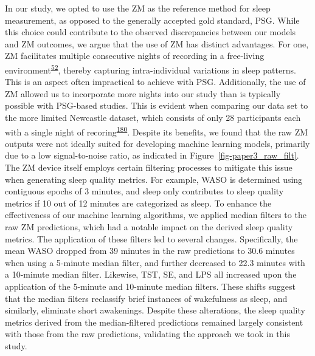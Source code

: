 \documentclass[
  10pt,
]{scrbook}
\begin{document}
In our study, we opted to use the ZM as the reference method for sleep
measurement, as opposed to the generally accepted gold standard, PSG.
While this choice could contribute to the observed discrepancies between
our models and ZM outcomes, we argue that the use of ZM has distinct
advantages. For one, ZM facilitates multiple consecutive nights of
recording in a free-living
environment\textsuperscript{\protect\hyperlink{ref-pedersen_self-administered_2021}{52}},
thereby capturing intra-individual variations in sleep patterns. This is
an aspect often impractical to achieve with PSG. Additionally, the use
of ZM allowed us to incorporate more nights into our study than is
typically possible with PSG-based studies. This is evident when
comparing our data set to the more limited Newcastle dataset, which
consists of only 28 participants each with a single night of
recoring\textsuperscript{\protect\hyperlink{ref-hees_newcastle_2018}{180}}.
Despite its benefits, we found that the raw ZM outputs were not ideally
suited for developing machine learning models, primarily due to a low
signal-to-noise ratio, as indicated in Figure~\ref{fig-paper3_raw_filt}.
The ZM device itself employs certain filtering processes to mitigate
this issue when generating sleep quality metrics. For example, WASO is
determined using contiguous epochs of 3 minutes, and sleep only
contributes to sleep quality metrics if 10 out of 12 minutes are
categorized as sleep. To enhance the effectiveness of our machine
learning algorithms, we applied median filters to the raw ZM
predictions, which had a notable impact on the derived sleep quality
metrics. The application of these filters led to several changes.
Specifically, the mean WASO dropped from 39 minutes in the raw
predictions to 30.6 minutes when using a 5-minute median filter, and
further decreased to 22.3 minutes with a 10-minute median filter.
Likewise, TST, SE, and LPS all increased upon the application of the
5-minute and 10-minute median filters. These shifts suggest that the
median filters reclassify brief instances of wakefulness as sleep, and
similarly, eliminate short awakenings. Despite these alterations, the
sleep quality metrics derived from the median-filtered predictions
remained largely consistent with those from the raw predictions,
validating the approach we took in this study.
\end{document}
